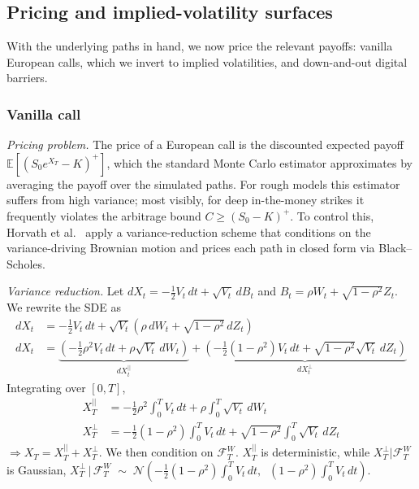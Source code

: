 \documentclass[12pt,a4paper]{article}
\theoremstyle{remark} \newtheorem{remark}[theorem]{Remark}
\begin{document}
\subsection{Pricing and implied-volatility surfaces}\label{implied vol generation chapter}
With the underlying paths in hand, we now price the relevant payoffs: vanilla European calls, which we invert to implied volatilities, and down-and-out digital barriers.
\subsubsection{Vanilla call}
\textit{Pricing problem.} The price of a European call is the discounted expected payoff $\mathbb{E}\!\left[(S_0e^{X_T}-K)^+\right]$, which the standard Monte Carlo estimator approximates by averaging the payoff over the simulated paths. For rough models this estimator suffers from high variance; most visibly, for deep in-the-money strikes it frequently violates the arbitrage bound $C\geq(S_0-K)^+$. To control this, Horvath et al.~\cite{2} apply a variance-reduction scheme that conditions on the variance-driving Brownian motion and prices each path in closed form via Black--Scholes.

\textit{Variance reduction.} Let $
dX_t = -\frac{1}{2}V_t\,dt + \sqrt{V_t}\,dB_t$
and  $B_t = \rho W_t + \sqrt{1-\rho^2}Z_t$. We rewrite the SDE as
\begin{align*}
dX_t &= -\frac{1}{2}V_t\,dt + \sqrt{V_t}\left(\rho\,dW_t + \sqrt{1-\rho^2}\,dZ_t\right)\\
dX_t &= \underbrace{\left(-\frac{1}{2}\rho^2 V_t\,dt + \rho\sqrt{V_t}\,dW_t\right)}_{dX_t^{||}} + \underbrace{\left(-\frac{1}{2}(1-\rho^2)V_t\,dt + \sqrt{1-\rho^2}\sqrt{V_t}\,dZ_t\right)}_{dX_t^{\perp}}
\end{align*}
Integrating over $[0,T]$,
\begin{align*}
X_T^{||} &= -\frac{1}{2}\rho^2\int_0^T V_t\,dt + \rho\int_0^T\sqrt{V_t}\,dW_t \\[6pt]
X_T^{\perp} &= -\frac{1}{2}(1-\rho^2)\int_0^T V_t\,dt + \sqrt{1-\rho^2}\int_0^T\sqrt{V_t}\,dZ_t\end{align*}
$\Rightarrow X_T = X_T^{||} + X_T^{\perp}$. We then condition on $\mathcal{F}^W_T$. $X_T^{||}$ is deterministic, while $X_T^{\perp}|\mathcal{F}^W_T$ is Gaussian, $\displaystyle
X_T^{\perp}\,|\,\mathcal{F}^W_T \;\sim\; \mathcal{N}\!\left(-\frac{1}{2}(1-\rho^2)\int_0^T V_t\,dt,\;\; (1-\rho^2)\int_0^T V_t\,dt\right)$.
\end{document}
